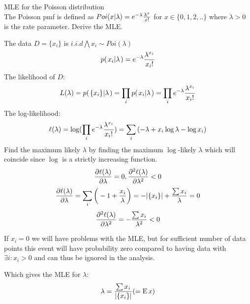 \documentclass[a4paper,twoside=false,abstract=false,numbers=noenddot,
titlepage=false,headings=small,parskip=half,version=last]{scrartcl}
\begin{document}
\begin{exercise}{3.6} MLE for the Poisson distribution \\
    The Poisson pmf is defined as
    $Poi(x|\lambda)=e^{-{\lambda}}\frac{{\lambda}^{x}}{{x}!}$ for $x \in \{0,1,2,..\}$
    where $\lambda>0$ is the rate parameter. Derive the MLE. 
\end{exercise}
\begin{solution}
    The data $D = \{x_i\}$ is $i.i.d \bigwedge x_i\sim Poi(\lambda)$
    \begin{equation}
        p{(\left. x_i \middle\vert \lambda \right.)} = e^{-{\lambda}}\frac{{\lambda}^{x_i}}{{x_i}!}
    \end{equation}
    The likelihood of $D$:
    \begin{equation}
        L(\lambda)=p{(\left. \{x_i\} \middle\vert \lambda \right.)}=\prod\limits_i{p{(\left. x_i \middle\vert \lambda \right.)}}=\prod\limits_i e^{-{\lambda}}\frac{{\lambda}^{x_i}}{{x_i}!}
    \end{equation}
    The log-likelihood:
    \begin{equation}
        \ell(\lambda)=\log(\prod\limits_ie^{-{\lambda}}\frac{{\lambda}^{x_i}}{{x_i}!})=
        \sum\limits_i{(-\lambda+x_i \log\lambda-\log x_i)}
    \end{equation}
    Find the maximum likely $\lambda$ by finding the maximum $\log$-likely
    $\lambda$ which will coincide since $\log$ is a strictly increasing
    function.
    \begin{equation}
        \frac{\partial{\ell(\lambda)}}{\partial{\lambda}} = 0,
        \frac{\partial^2{\ell(\lambda)}}{\partial{\lambda}^2} < 0
    \end{equation}
    \begin{equation}
        \frac{\partial{\ell(\lambda)}}{\partial{\lambda}} =
        \sum\limits_i{\bigg(-1+\frac{x_i}{\lambda}\bigg)}=-|\{x_i\}|+\frac{\sum{x_i}}{\lambda}=0
    \end{equation}
    \begin{equation}
        \frac{\partial^2{\ell(\lambda)}}{\partial{\lambda}^2} = 
        -\frac{\sum{x_i}}{\lambda^2} < 0
    \end{equation}
    \begin{remark}
        If $x_i=0$ we will have problems with the MLE, but for sufficient 
        number of data points this event will have probability zero compared to
        having data with $\exists i:x_i>0$ and can thus be ignored in the
        analysis.
    \end{remark}
    Which gives the MLE for $\lambda$:
    \begin{equation}
        \lambda=\frac{\sum{x_i}}{|\{x_i\}|}(={\rm E}\, x)
    \end{equation}
\end{solution}
\end{document}
